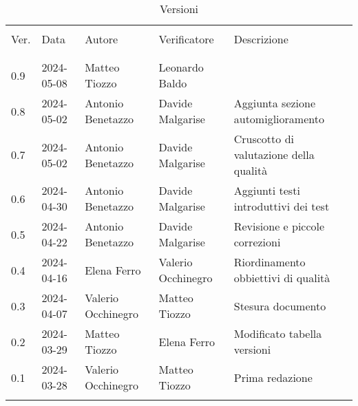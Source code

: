 \documentclass[italian,12pt]{article} %
\begin{document}

\newpage

\captionsetup[table]{list=no}
\begin{table}[!h]
	\caption*{Versioni}
	\footnotesize
	\begin{center}
		\begin{tabular}{ l l l l p{6cm} }
			\hline                                                                                               \\[-2ex]
			Ver. & Data       & Autore             & Verificatore       & Descrizione                            \\
			\\[-2ex] \hline \\[-1.5ex]
			0.9  & 2024-05-08 & Matteo Tiozzo      & Leonardo Baldo     &     \\
			0.8  & 2024-05-02 & Antonio Benetazzo  & Davide Malgarise   & Aggiunta sezione automiglioramento     \\
			0.7  & 2024-05-02 & Antonio Benetazzo  & Davide Malgarise   & Cruscotto di valutazione della qualità \\
			0.6  & 2024-04-30 & Antonio Benetazzo  & Davide Malgarise   & Aggiunti testi introduttivi dei test   \\
			0.5  & 2024-04-22 & Antonio Benetazzo  & Davide Malgarise   & Revisione e piccole correzioni         \\
			0.4  & 2024-04-16 & Elena Ferro        & Valerio Occhinegro & Riordinamento obbiettivi di qualità    \\
			0.3  & 2024-04-07 & Valerio Occhinegro & Matteo Tiozzo      & Stesura documento                      \\
			0.2  & 2024-03-29 & Matteo Tiozzo      & Elena Ferro        & Modificato tabella versioni            \\
			0.1  & 2024-03-28 & Valerio Occhinegro & Matteo Tiozzo      & Prima redazione                        \\
			\\[-1.5ex] \hline
		\end{tabular}
	\end{center}
\end{table}
\captionsetup[table]{list=yes}
\newpage
\tableofcontents
\listoftables
\listoffigures
\newpage





\end{document}
